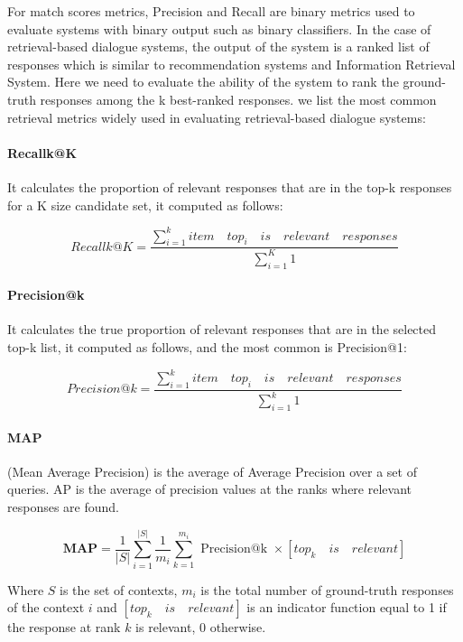 \documentclass{article}
\begin{document}
For match scores metrics, Precision and Recall are binary metrics used to evaluate systems with binary output such as binary classifiers. In the case of retrieval-based dialogue systems, the output of the system is a ranked list of responses which is similar to recommendation systems and Information Retrieval System. Here we need to evaluate the ability of the system to rank the ground-truth responses among the k best-ranked responses. we list the most common retrieval metrics widely used in evaluating retrieval-based dialogue systems:

\paragraph{Recallk@K} It calculates the proportion of relevant responses that are in the top-k responses for a K size candidate set, it computed as follows:

\begin{equation}
    Recallk@K = \frac{\sum_{i=1}^{k} item \quad top_i\quad is \quad relevant \quad  responses}{\sum_{i=1}^{K} 1}
\end{equation}

\paragraph{Precision@k} It calculates the true proportion of relevant responses that are in the selected top-k list, it computed as follows, and the most common is Precision@1:

\begin{equation}
    Precision@k = \frac{\sum_{i=1}^{k} item \quad top_i\quad is \quad relevant \quad  responses}{\sum_{i=1}^{k} 1}
\end{equation}

\paragraph{MAP} (Mean Average Precision) is the average of Average Precision over a set of queries. AP is the average of precision values at the ranks where relevant responses are found.


\begin{equation}
\mathbf{MAP}=\frac{1}{|S|} \sum_{i=1}^{|S|} \frac{1}{m_{i}} \sum_{k=1}^{m_{i}} \text { Precision@k } \times [top_k\quad is \quad relevant]
\end{equation}

Where $S$ is the set of contexts, $m_i$ is the total number of ground-truth responses of the context $i$ and $[top_k\quad is \quad relevant]$ is an indicator function equal to 1 if the response at rank $k$ is relevant, 0 otherwise.
\end{document}
